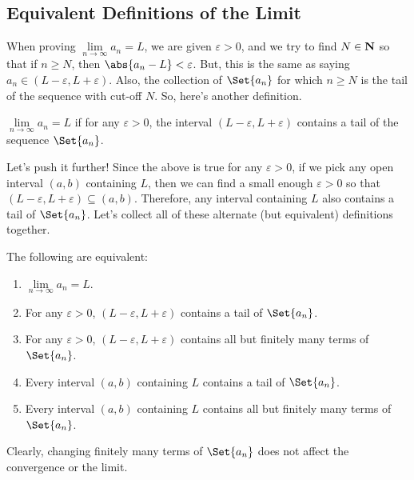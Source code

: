 \subsection{Equivalent Definitions of the Limit}
When proving $ \lim\limits_{{n} \to {\infty}}a_n=L $, we are given $ \varepsilon>0 $, and we try to find $ N\in\mathbf{N} $
so that if $ n\ge N $, then $ \abs{a_n-L}<\varepsilon $. But, this is the same as saying
$ a_n\in (L-\varepsilon,L+\varepsilon) $. Also, the collection of $ \Set{a_n} $ for which
$ n\ge N $ is the tail of the sequence with cut-off $ N $. So, here's another definition.
\begin{Definition}{}{}
    $ \lim\limits_{{n} \to {\infty}}a_n=L $ if for any $ \varepsilon>0 $, the interval
    $ (L-\varepsilon,L+\varepsilon) $ contains a tail of the sequence $ \Set{a_n} $.
\end{Definition}
Let's push it further! Since the above is true for any $ \varepsilon>0 $, if we pick any
open interval $ (a,b) $ containing $ L $, then we can find a small enough $ \varepsilon>0 $
so that $ (L-\varepsilon,L+\varepsilon)\subseteq (a,b) $. Therefore, any interval containing
$ L $ also contains a tail of $ \Set{a_n} $. Let's collect all of these alternate (but equivalent) definitions together.
\begin{Theorem}{}{}
    The following are equivalent:
    \begin{enumerate}[(1)]
        \item $ \lim\limits_{{n} \to {\infty}}a_n=L $.
        \item For any $ \varepsilon>0 $, $ (L-\varepsilon,L+\varepsilon) $ contains a tail of $ \Set{a_n} $.
        \item For any $ \varepsilon>0 $, $ (L-\varepsilon,L+\varepsilon) $ contains all but finitely many terms of $ \Set{a_n} $.
        \item Every interval $ (a,b) $ containing $ L $ contains a tail of $ \Set{a_n} $.
        \item Every interval $ (a,b) $ containing $ L $ contains all but finitely many terms of $ \Set{a_n} $.
    \end{enumerate}
    Clearly, changing finitely many terms of $ \Set{a_n} $ does not affect the convergence or the limit.
\end{Theorem}
